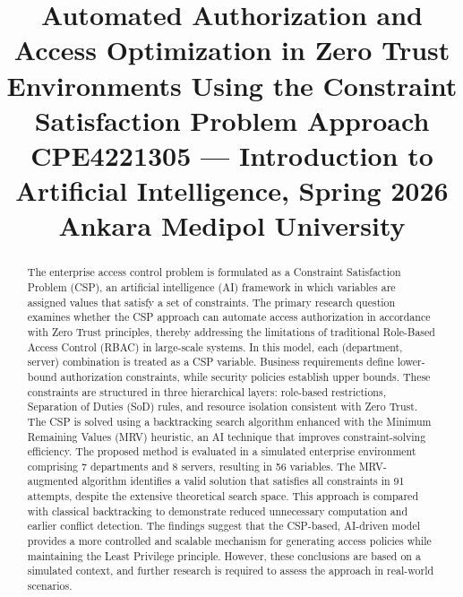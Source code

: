 \documentclass[conference]{IEEEtran}
\begin{document}
	
	\title{Automated Authorization and Access Optimization in Zero Trust Environments Using the Constraint Satisfaction Problem Approach\\
		{\footnotesize CPE4221305 --- Introduction to Artificial Intelligence, Spring 2026\\
			Ankara Medipol University}
	}
	
	\author{
	}
	
	\maketitle
	
	\begin{abstract}
		The enterprise access control problem is formulated as a Constraint Satisfaction Problem (CSP), an artificial intelligence (AI) framework in which variables are assigned values that satisfy a set of constraints. The primary research question examines whether the CSP approach can automate access authorization in accordance with Zero Trust principles, thereby addressing the limitations of traditional Role-Based Access Control (RBAC) in large-scale systems. In this model, each (department, server) combination is treated as a CSP variable. Business requirements define lower-bound authorization constraints, while security policies establish upper bounds. These constraints are structured in three hierarchical layers: role-based restrictions, Separation of Duties (SoD) rules, and resource isolation consistent with Zero Trust. The CSP is solved using a backtracking search algorithm enhanced with the Minimum Remaining Values (MRV) heuristic, an AI technique that improves constraint-solving efficiency. The proposed method is evaluated in a simulated enterprise environment comprising 7 departments and 8 servers, resulting in 56 variables. The MRV-augmented algorithm identifies a valid solution that satisfies all constraints in 91 attempts, despite the extensive theoretical search space. This approach is compared with classical backtracking to demonstrate reduced unnecessary computation and earlier conflict detection. The findings suggest that the CSP-based, AI-driven model provides a more controlled and scalable mechanism for generating access policies while maintaining the Least Privilege principle. However, these conclusions are based on a simulated context, and further research is required to assess the approach in real-world scenarios.
	\end{abstract}
	
\end{document}
